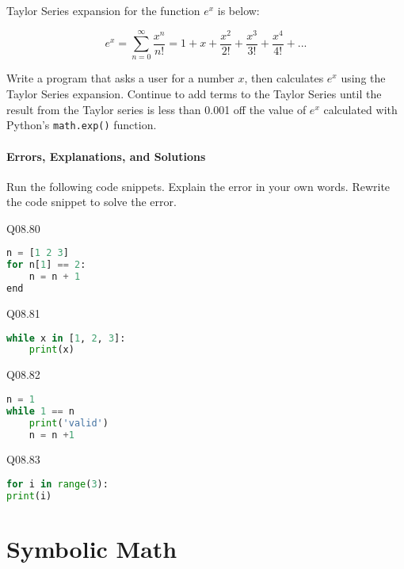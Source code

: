 \documentclass{book}
\newcommand{\passthrough}[1]{#1}
\begin{document}
Taylor Series expansion for the function \(e^x\) is below:

\[  {e^x} = \sum\limits_{n = 0}^\infty  {\frac{{{x^n}}}{{n!}}}  = 1 + x + \frac{{{x^2}}}{{2!}} + \frac{{{x^3}}}{{3!}} + \frac{{{x^4}}}{{4!}} + ... \]

Write a program that asks a user for a number \(x\), then calculates
\(e^x\) using the Taylor Series expansion. Continue to add terms to the
Taylor Series until the result from the Taylor series is less than 0.001
off the value of \(e^x\) calculated with Python's
\passthrough{\lstinline!math.exp()!} function.
    




    
        \hypertarget{errors-explanations-and-solutions}{%
\subsubsection{Errors, Explanations, and
Solutions}\label{errors-explanations-and-solutions}}

Run the following code snippets. Explain the error in your own words.
Rewrite the code snippet to solve the error.
    




    
        Q08.80

\begin{lstlisting}[language=Python]
n = [1 2 3]
for n[1] == 2:
    n = n + 1
end
\end{lstlisting}

Q08.81

\begin{lstlisting}[language=Python]
while x in [1, 2, 3]:
    print(x)
\end{lstlisting}

Q08.82

\begin{lstlisting}[language=Python]
n = 1
while 1 == n
    print('valid')
    n = n +1
\end{lstlisting}

Q08.83

\begin{lstlisting}[language=Python]
for i in range(3):
print(i)
\end{lstlisting}
    




    
        \hypertarget{symbolic-math}{%
\chapter{Symbolic Math}\label{symbolic-math}}
    
\end{document}
